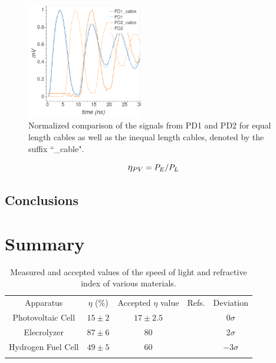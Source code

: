 \documentclass[aps,prl,reprint]{revtex4-2}
\begin{document}
\begin{figure}[h]
\includegraphics[width=0.45\textwidth]{./l4_A.png}
\caption{\label{comparison} Normalized comparison of the signals from PD1 and PD2 for equal
length cables as well as the inequal length cables, denoted by the suffix ``\_cable".}
\end{figure}






\newpage

\begin{equation}
    \mathlarger{\eta_{PV}}=P_E/P_L
    \label{eta_PV}
\end{equation}

\subsection{Conclusions}

\section{Summary}

\begin{widetext}
\begin{center}
\begin{table}[h]
\renewcommand{\arraystretch}{1.35}
\setlength{\tabcolsep}{10pt}
\caption{\label{}Measured and accepted values of the speed of light and refractive index of various materials.}
\begin{tabular}{|c|c|c|c|c|}
\toprule
Apparatus &  $\eta$ (\%) & Accepted $\eta$ value & Refs. & Deviation \\
\colrule
Photovoltaic Cell &  $15 \pm 2$ & $17 \pm 2.5$ & \cite{Solar Cell} & $0\sigma$  \\
\colrule
Elecrolyzer &  $87 \pm 6$ & 80 & \cite{Electrolyzer} & $2\sigma$  \\
\colrule
Hydrogen Fuel Cell &  $49 \pm 5$ & 60 & \cite{Fuel Cell} & $-3\sigma$  \\
\botrule
\end{tabular}
\end{table}
\end{center}
\end{widetext}
\end{document}

